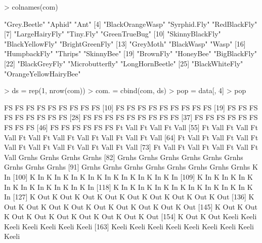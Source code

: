 \documentclass[11pt]{amsart}
\begin{document}
\begin{Schunk}
\begin{Sinput}
> colnames(com)
\end{Sinput}
\begin{Soutput}
 [1] "Grey.Beetle"          "Aphid"                "Ant"                 
 [4] "BlackOrangeWasp"      "Syrphid.Fly"          "RedBlackFly"         
 [7] "LargeHairyFly"        "Tiny.Fly"             "GreenTrueBug"        
[10] "SkinnyBlackFly"       "BlackYellowFly"       "BrightGreenFly"      
[13] "GreyMoth"             "BlackWasp"            "Wasp"                
[16] "HumpbackFly"          "Thrips"               "SkinnyBee"           
[19] "BrownFly"             "HoneyBee"             "BigBlackFly"         
[22] "BlackGreyFly"         "Microbutterfly"       "LongHornBeetle"      
[25] "BlackWhiteFly"        "OrangeYellowHairyBee"
\end{Soutput}
\begin{Sinput}
> ds = rep(1, nrow(com))
> com. = cbind(com, ds)
> pop = data[, 4]
> pop
\end{Sinput}
\begin{Soutput}
  [1] FS      FS      FS      FS      FS      FS      FS      FS      FS     
 [10] FS      FS      FS      FS      FS      FS      FS      FS      FS     
 [19] FS      FS      FS      FS      FS      FS      FS      FS      FS     
 [28] FS      FS      FS      FS      FS      FS      FS      FS      FS     
 [37] FS      FS      FS      FS      FS      FS      FS      FS      FS     
 [46] FS      FS      FS      FS      FS      FS      Ft Vall Ft Vall Ft Vall
 [55] Ft Vall Ft Vall Ft Vall Ft Vall Ft Vall Ft Vall Ft Vall Ft Vall Ft Vall
 [64] Ft Vall Ft Vall Ft Vall Ft Vall Ft Vall Ft Vall Ft Vall Ft Vall Ft Vall
 [73] Ft Vall Ft Vall Ft Vall Ft Vall Ft Vall Grnhs   Grnhs   Grnhs   Grnhs  
 [82] Grnhs   Grnhs   Grnhs   Grnhs   Grnhs   Grnhs   Grnhs   Grnhs   Grnhs  
 [91] Grnhs   Grnhs   Grnhs   Grnhs   Grnhs   Grnhs   Grnhs   Grnhs   K In   
[100] K In    K In    K In    K In    K In    K In    K In    K In    K In   
[109] K In    K In    K In    K In    K In    K In    K In    K In    K In   
[118] K In    K In    K In    K In    K In    K In    K In    K In    K In   
[127] K Out   K Out   K Out   K Out   K Out   K Out   K Out   K Out   K Out  
[136] K Out   K Out   K Out   K Out   K Out   K Out   K Out   K Out   K Out  
[145] K Out   K Out   K Out   K Out   K Out   K Out   K Out   K Out   K Out  
[154] K Out   K Out   Keeli   Keeli   Keeli   Keeli   Keeli   Keeli   Keeli  
[163] Keeli   Keeli   Keeli   Keeli   Keeli   Keeli   Keeli   Keeli   Keeli  

\end{Soutput}
\end{Schunk}
\end{document}
